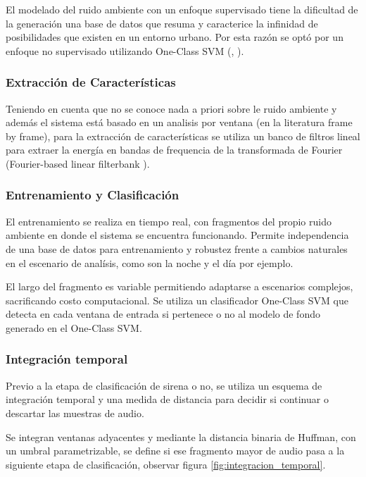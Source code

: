 \documentclass{article}
\begin{document}
El modelado del ruido ambiente con un enfoque supervisado tiene la dificultad de  la generación una base de datos que resuma y caracterice la infinidad de posibilidades que existen en un entorno urbano. Por esta razón se optó por un enfoque no supervisado utilizando One-Class SVM (\cite{rabaoui2008one}, \citep{lecomte2011abnormal}).

\subsubsection*{Extracción de Características}
Teniendo en cuenta que no se conoce nada a priori sobre le ruido ambiente y además el sistema está basado en un analisis por ventana (en la literatura frame by frame), para la extracción de características se utiliza un banco de filtros lineal para extraer la energía en bandas de frequencia de la transformada de Fourier (Fourier-based linear filterbank \citep{lecomte2011abnormal}).

\subsubsection*{Entrenamiento y Clasificación}
El entrenamiento se realiza en tiempo real, con fragmentos del propio ruido ambiente en donde el sistema se encuentra funcionando. Permite independencia de una base de datos para entrenamiento y robustez frente a cambios naturales en el escenario de analísis, como son la noche y el día por ejemplo. 
\smallskip

El largo del fragmento es variable permitiendo adaptarse a escenarios complejos, sacrificando costo computacional. Se utiliza un clasificador One-Class SVM que detecta en cada ventana de entrada si pertenece o no al modelo de fondo generado en el One-Class SVM.

\subsubsection{Integración temporal}

Previo a la etapa de clasificación de sirena o no, se utiliza un esquema de integración temporal y una medida de distancia para decidir si continuar o descartar las muestras de audio.

\smallskip
Se integran ventanas adyacentes y mediante la distancia binaria de Huffman, con un umbral parametrizable, se define si ese fragmento mayor de audio pasa a la siguiente etapa de clasificación, observar figura \ref{fig:integracion_temporal}. 
\end{document}
